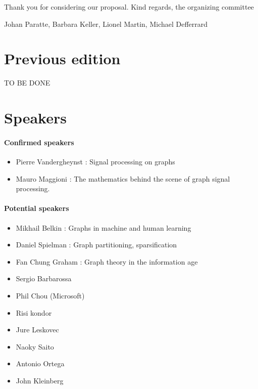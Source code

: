 \documentclass[a4paper]{scrartcl}
\newcommand{\nati}[1]{{\textcolor[rgb]{.1,.6,.1}{#1}}}
\begin{document}
Thank you for considering our proposal. Kind regards, the organizing committee

\vspace{0.5cm}

Johan Paratte, Barbara Keller, Lionel Martin, Michael Defferrard









\newpage

\section{Previous edition}
\nati{TO BE DONE}

\section{Speakers}

\paragraph{Confirmed speakers}
\begin{itemize}
	\item Pierre Vandergheynst : Signal processing on graphs
	\item Mauro Maggioni : The mathematics behind the scene of graph signal processing.
\end{itemize}

\paragraph{Potential speakers}
\begin{itemize}
	\item Mikhail Belkin : Graphs in machine and human learning
	\item Daniel Spielman : Graph partitioning, sparsification
	\item Fan Chung Graham : Graph theory in the information age
	\item Sergio Barbarossa
	\item Phil Chou (Microsoft)
	\item Risi kondor
	\item Jure Leskovec
	\item Naoky Saito
	\item Antonio Ortega
	\item John Kleinberg
\end{itemize}
\end{document}

